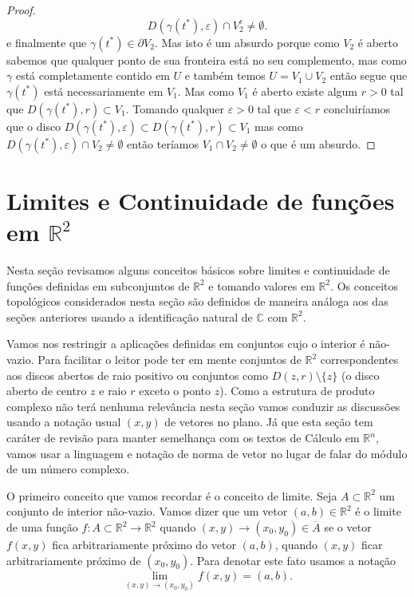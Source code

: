\begin{proof}
\[D(\gamma(t^*),\varepsilon)\cap V_2^c \neq \emptyset.
\]
e finalmente que $\gamma(t^{*})\in \partial V_2$.
Mas isto é um absurdo porque como $V_2$ é aberto sabemos que qualquer ponto de sua fronteira 
está no seu complemento, mas como $\gamma$ está completamente contido em $U$ e também temos
$U=V_1\cup V_2$ então segue que $\gamma(t^*)$ está necessariamente em $V_1$. Mas
como $V_1$ é aberto existe algum $r>0$ tal que $D(\gamma(t^{*}),r)\subset V_1$.
Tomando qualquer $\varepsilon>0$ tal que $\varepsilon<r$ concluiríamos que
o disco $D(\gamma(t^{*}),\varepsilon)\subset D(\gamma(t^{*}),r)\subset V_1$
mas como $D(\gamma(t^*),\varepsilon)\cap V_2 \neq \emptyset$ 
então teríamos $V_1\cap V_2\neq\emptyset$ o que é um absurdo.

\end{proof}


\section{Limites e Continuidade de funções em $\mathbb{R}^2$}

Nesta seção revisamos alguns conceitos básicos sobre limites e continuidade de funções 
definidas em subconjuntos de $\mathbb{R}^2$ e tomando valores em $\mathbb{R}^2$. 
Os conceitos topológicos considerados nesta seção são definidos de maneira
análoga aos das seções anteriores usando a identificação natural
de $\mathbb{C}$ com $\mathbb{R}^2$. 




Vamos nos restringir a aplicações definidas em conjuntos cujo o interior é não-vazio. 
Para facilitar o leitor pode ter em mente conjuntos de $\mathbb{R}^2$ 
correspondentes aos discos abertos de raio positivo ou 
conjuntos como $D(z,r)\setminus\{z\}$ (o disco aberto de centro $z$ e raio $r$ exceto o ponto $z$).
Como a estrutura de produto complexo não terá nenhuma relevância nesta seção vamos 
conduzir as discussões usando a notação usual $(x,y)$ de vetores no plano. Já que esta
seção tem caráter de revisão para
manter semelhança com os textos de Cálculo em $\mathbb{R}^n$, vamos usar a linguagem 
e notação de norma de vetor no lugar de falar do módulo de um número complexo. 

O primeiro conceito que vamos recordar é o conceito de limite. 
Seja $A\subset \mathbb{R}^2$ um conjunto de interior não-vazio. Vamos dizer que 
um vetor $(a,b)\in\mathbb{R}^2$ é o limite de uma função 
$f:A\subset \mathbb{R}^2\to\mathbb{R}^2$ quando $(x,y)\to (x_0,y_0)\in \overline{A}$
se o vetor $f(x,y)$ fica arbitrariamente próximo do vetor $(a,b)$,  
quando $(x,y)$ ficar arbitrariamente próximo de $(x_0,y_0)$. 
Para denotar este fato usamos a notação 
\[
\lim_{(x,y)\to (x_0,y_0)} f(x,y) = (a,b).
\]

